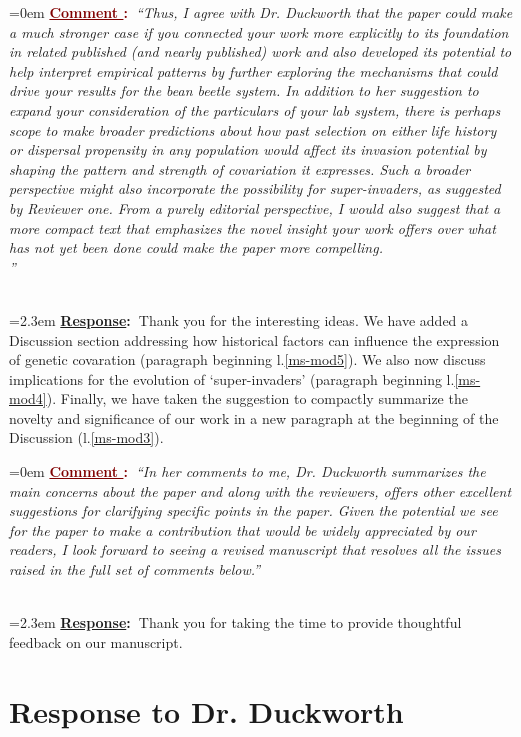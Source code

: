 \documentclass[12pt]{article}
\newcounter{cN}
\newcommand{\comment}[1]{
	\vspace{2em}
	\refstepcounter{cN} %
	\noindent \hangindent=0em \textbf{\textcolor{Maroon}{\uline{Comment \thecN}:~}}\emph{``#1''}
	}
\newcommand{\response}[1]{
	\\[0.25em]
	\hangindent=2.3em \textbf{\textcolor{NavyBlue}{\uline{Response}:~}}#1
	}
\begin{document}
\comment{Thus, I agree with Dr. Duckworth that the paper could make a much stronger case if you connected your work more explicitly to its foundation in related published (and nearly published) work and also developed its potential to help interpret empirical patterns by further exploring the mechanisms that could drive your results for the bean beetle system.
In addition to her suggestion to expand your consideration of the particulars of your lab system, there is perhaps scope to make broader predictions about how past selection on either life history or dispersal propensity in any population would affect its invasion potential by shaping the pattern and strength of covariation it expresses.
Such a broader perspective might also incorporate the possibility for super-invaders, as suggested by Reviewer one.
From a purely editorial perspective, I would also suggest that a more compact text that emphasizes the novel insight your work offers over what has not yet been done could make the paper more compelling.
\\
}
\response{Thank you for the interesting ideas.
We have added a Discussion section addressing how historical factors can influence the expression of genetic covaration (paragraph beginning l.\ref{ms-mod5}).
We also now discuss implications for the evolution of `super-invaders' (paragraph beginning l.\ref{ms-mod4}).
Finally, we have taken the suggestion to compactly summarize the novelty and significance of our work in a new paragraph at the beginning of the Discussion (l.\ref{ms-mod3}).
}

\comment{In her comments to me, Dr. Duckworth summarizes the main concerns about the paper and along with the reviewers, offers other excellent suggestions for clarifying specific points in the paper.
Given the potential we see for the paper to make a contribution that would be widely appreciated by our readers, I look forward to seeing a revised manuscript that resolves all the issues raised in the full set of comments below.}
\response{Thank you for taking the time to provide thoughtful feedback on our manuscript.}

\section{Response to Dr. Duckworth}
\vspace{-2em}
\end{document}
